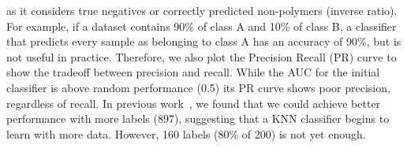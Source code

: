 as it considers true negatives or correctly predicted non-polymers (inverse ratio).
For example, if a dataset contains 90\% of class A and 10\% of class B, 
a classifier that predicts every sample as belonging to class A has an accuracy of 90\%, 
but is not useful in practice.
Therefore, we also plot the Precision Recall (PR) curve to show the tradeoff between precision and recall.
While the AUC for the initial classifier is above random performance (0.5) 
its PR curve shows poor precision, regardless of recall.
In previous work~\cite{tchoua2019polyner}, we found that we could 
achieve better performance with more labels (897), suggesting that a KNN classifier begins to learn with more data. 
However, 160 labels (80\% of 200) is not yet enough. %


